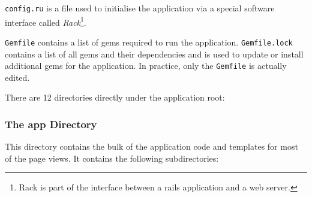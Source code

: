 \documentclass[12pt,twoside]{article}
\begin{document}
\verb=config.ru= is a file used to initialise the application via a
special software interface called \emph{Rack}\footnote{Rack is part
of the interface between a rails application and a web server.}.

\verb=Gemfile= contains a list of gems required to run the application.
\verb=Gemfile.lock= contains a list of all gems and their dependencies
and is used to update or install additional gems for the application.
In practice, only the \verb=Gemfile= is actually edited.

There are 12 directories directly under the application root:
\subsubsection{The app Directory}
This directory contains the bulk of the application code and templates 
for most of the page views. It contains the following subdirectories:
\end{document}
